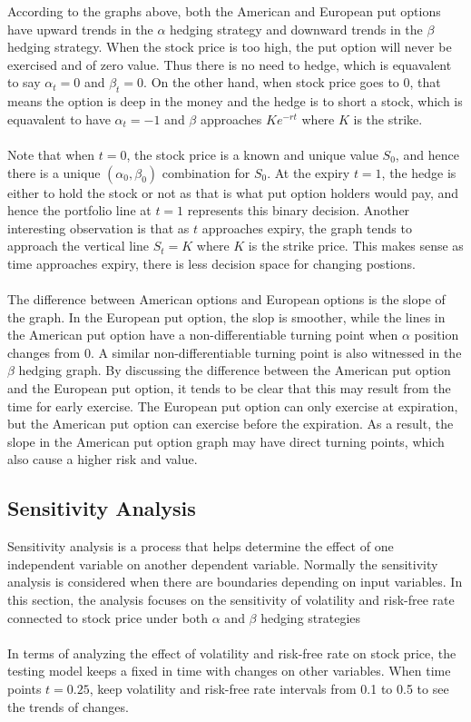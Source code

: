 \documentclass[12pt]{article}
\begin{document}
\noindent 
According to the graphs above, both the American and European put options have upward trends in the $\alpha$ hedging strategy and 
downward trends in the $\beta$ hedging strategy. When the stock price is too high,
the put option will never be exercised and of zero value. Thus there is no need to hedge, which is equavalent to say $\alpha_t = 0$ and
$\beta_t = 0$. On the other hand, when stock price goes to 0, that means the option is deep in the money and the hedge is to short a 
stock, which is equavalent to have $\alpha_t=-1$ and $\beta$ approaches $Ke^{-rt}$ where $K$ is the strike.
\\\\
Note that when $t=0$, the stock price is a known and unique value $S_0$, and hence 
there is a unique $(\alpha_0, \beta_0)$ combination for $S_0$. At the expiry $t=1$, the hedge is either to hold the stock or not as 
that is what put option holders would pay, and hence the portfolio line at $t=1$ represents this binary decision. Another interesting 
observation is that as $t$ approaches expiry, the graph tends to approach the vertical line $S_t = K$ where $K$ is the strike price. 
This makes sense as time approaches expiry, there is less decision space for changing postions.
\\\\
The difference between American options and European options is the slope of the graph. In the European put option, the slop is 
smoother, while the lines in the American put option have a non-differentiable turning point when $\alpha$ position changes from 0. 
A similar non-differentiable turning point is also witnessed in the $\beta$ hedging graph. By discussing the difference between the 
American put option and the European put option, it tends to be clear that this may result from the time for early exercise. 
The European put option can only exercise at expiration, but the American put option can exercise before the expiration. As a result, the slope in 
the American put option graph may have direct turning points, which also cause a higher risk and value.\\

\subsection{Sensitivity Analysis}
Sensitivity analysis is a process that helps determine the effect of one independent variable on another dependent variable. Normally the sensitivity 
analysis is considered when there are boundaries depending on input variables. In this section, the analysis focuses on the sensitivity of volatility 
and risk-free rate connected to stock price under both $\alpha$ and $\beta$ hedging strategies\\\\
In terms of analyzing the effect of volatility and risk-free rate on stock price, the testing model keeps a fixed in time with changes on other variables. 
When time points $t=0.25$, keep volatility and risk-free rate intervals from 0.1 to 0.5 to see the trends of changes.
\end{document}
